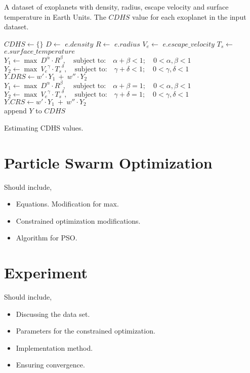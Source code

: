 \documentclass{article}
\newenvironment{pointers}{%
  \noindent Should include,
  \begin{itemize}
    \setlength{\itemsep}{-1pt}}{%
\end{itemize}}
\begin{document}
\begin{algorithm}
  \begin{algorithmic}
    \Require A dataset of exoplanets with density, radius, escape velocity and surface temperature in Earth Units.
    \Ensure The $CDHS$ value for each exoplanet in the input dataset.
    
    \State $CDHS \gets \{\}$
      \State $D \gets$ $e.density$
      \State $R \gets$ $e.radius$
      \State $V_e \gets$ $e.escape\_velocity$
      \State $T_s \gets$ $e.surface\_temperature$
      \\ 
      \State $Y_1 \gets \max\ D^\alpha\cdot R^\beta,\quad \text{subject to:}\quad \alpha+\beta<1;\quad 0<\alpha,\beta<1$
      \State $Y_2 \gets \max\ {V_e}^\gamma\cdot {T_s}^\delta,\quad \text{subject to:}\quad \gamma+\delta<1;\quad
      0<\gamma,\delta<1$
      \State $Y.{DRS} \gets w'\cdot Y_1\ +\ w''\cdot Y_2$
      \\
      \State $Y_1 \gets \max\ D^\alpha\cdot R^\beta,\quad \text{subject to:}\quad \alpha+\beta=1;\quad 0<\alpha,\beta<1$
      \State $Y_2 \gets \max\ {V_e}^\gamma\cdot {T_s}^\delta,\quad \text{subject to:}\quad \gamma+\delta=1;\quad
      0<\gamma,\delta<1$
      \State $Y.{CRS} \gets w'\cdot Y_1\ +\ w''\cdot Y_2$
      \\
      \State append $Y$ to $CDHS$
    \EndFor
  \end{algorithmic}
  \caption{Estimating CDHS values.}
  \label{estCDHS}
\end{algorithm}

\section{Particle Swarm Optimization}
\begin{pointers}
\item Equations. Modification for max.
\item Constrained optimization modifications.
\item Algorithm for PSO\@.
\end{pointers}


\section{Experiment}
\begin{pointers}
\item Discussing the data set.
\item Parameters for the constrained optimization.
\item Implementation method.
\item Ensuring convergence.
\end{pointers}
\end{document}
